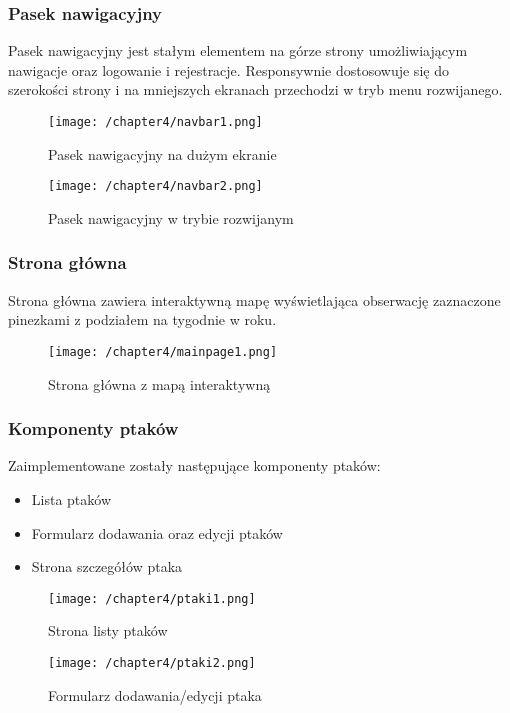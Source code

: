 \subsubsection{Pasek nawigacyjny}
Pasek nawigacyjny jest stałym elementem na górze strony umożliwiającym nawigacje oraz logowanie i rejestracje. Responsywnie dostosowuje się do szerokości strony i na mniejszych ekranach przechodzi w tryb menu rozwijanego.

\begin{figure}[!htb]
	\centering
	\texttt{[image: /chapter4/navbar1.png]}
	\caption{Pasek nawigacyjny na dużym ekranie}
	\label{fig:navbar1}
\end{figure}

\begin{figure}[!htb]
	\centering
	\texttt{[image: /chapter4/navbar2.png]}
	\caption{Pasek nawigacyjny w trybie rozwijanym}
	\label{fig:navbar2}
\end{figure}

\subsubsection{Strona główna}
Strona główna zawiera interaktywną mapę wyświetlająca obserwację zaznaczone pinezkami z podziałem na tygodnie w roku.

\begin{figure}[!htb]
	\centering
	\texttt{[image: /chapter4/mainpage1.png]}
	\caption{Strona główna z mapą interaktywną}
	\label{fig:mainpage1}
\end{figure}

\subsubsection{Komponenty ptaków}
Zaimplementowane zostały następujące komponenty ptaków:
\begin{itemize}
	\item Lista ptaków
	\item Formularz dodawania oraz edycji ptaków
	\item Strona szczegółów ptaka
\end{itemize}

\begin{figure}[!htb]
	\centering
	\texttt{[image: /chapter4/ptaki1.png]}
	\caption{Strona listy ptaków}
	\label{fig:ptaki1}
\end{figure}

\begin{figure}[!htb]
	\centering
	\texttt{[image: /chapter4/ptaki2.png]}
	\caption{Formularz dodawania/edycji ptaka}
	\label{fig:ptaki2}
\end{figure}

